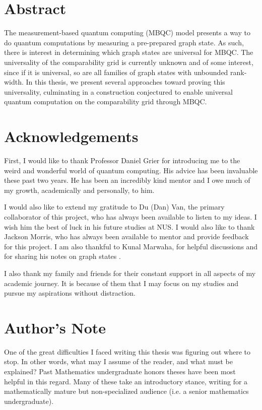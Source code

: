 \section*{Abstract}

The measurement-based quantum computing (MBQC) model presents a way to do quantum computations by measuring a pre-prepared graph state. As such, there is interest in determining which graph states are universal for MBQC. The universality of the comparability grid is currently unknown and of some interest, since if it is universal, so are all families of graph states with unbounded rank-width. In this thesis, we present several approaches toward proving this universality, culminating in a construction conjectured to enable universal quantum computation on the comparability grid through MBQC.

\section*{Acknowledgements}

First, I would like to thank Professor Daniel Grier for introducing me to the weird and wonderful world of quantum computing. His advice has been invaluable these past two years. He has been an incredibly kind mentor and I owe much of my growth, academically and personally, to him.

I would also like to extend my gratitude to Du (Dan) Van, the primary collaborator of this project, who has always been available to listen to my ideas. I wish him the best of luck in his future studies at NUS. I would also like to thank Jackson Morris, who has always been available to mentor and provide feedback for this project. I am also thankful to Kunal Marwaha, for helpful discussions and for sharing his notes on graph states \cite{MarwahaPrivateCorrespondence}.

I also thank my family and friends for their constant support in all aspects of my academic journey. It is because of them that I may focus on my studies and pursue my aspirations without distraction.

\section*{Author's Note}

One of the great difficulties I faced writing this thesis was figuring out where to stop. In other words, what may I assume of the reader, and what must be explained? Past Mathematics undergraduate honors theses have been most helpful in this regard. Many of these take an introductory stance, writing for a mathematically mature but non-specialized audience (i.e. a senior mathematics undergraduate). 

